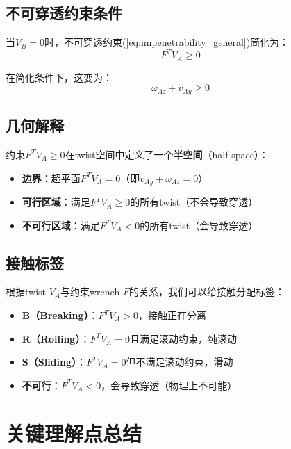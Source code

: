 \documentclass[12pt,a4paper]{article}
\begin{document}
\subsection{不可穿透约束条件}

当$V_B = 0$时，不可穿透约束(\ref{eq:impenetrability_general})简化为：
\begin{equation}
F^T V_A \geq 0
\label{eq:impenetrability_simplified}
\end{equation}

在简化条件下，这变为：
\begin{equation}
\omega_{Az} + v_{Ay} \geq 0
\label{eq:impenetrability_simplified_expanded}
\end{equation}

\subsection{几何解释}

约束$F^T V_A \geq 0$在twist空间中定义了一个\textbf{半空间}（half-space）：

\begin{itemize}
\item \textbf{边界}：超平面$F^T V_A = 0$（即$v_{Ay} + \omega_{Az} = 0$）
\item \textbf{可行区域}：满足$F^T V_A \geq 0$的所有twist（不会导致穿透）
\item \textbf{不可行区域}：满足$F^T V_A < 0$的所有twist（会导致穿透）
\end{itemize}

\subsection{接触标签}

根据twist $V_A$与约束wrench $F$的关系，我们可以给接触分配标签：

\begin{itemize}
\item \textbf{B（Breaking）}：$F^T V_A > 0$，接触正在分离
\item \textbf{R（Rolling）}：$F^T V_A = 0$且满足滚动约束，纯滚动
\item \textbf{S（Sliding）}：$F^T V_A = 0$但不满足滚动约束，滑动
\item \textbf{不可行}：$F^T V_A < 0$，会导致穿透（物理上不可能）
\end{itemize}

\section{关键理解点总结}
\end{document}
